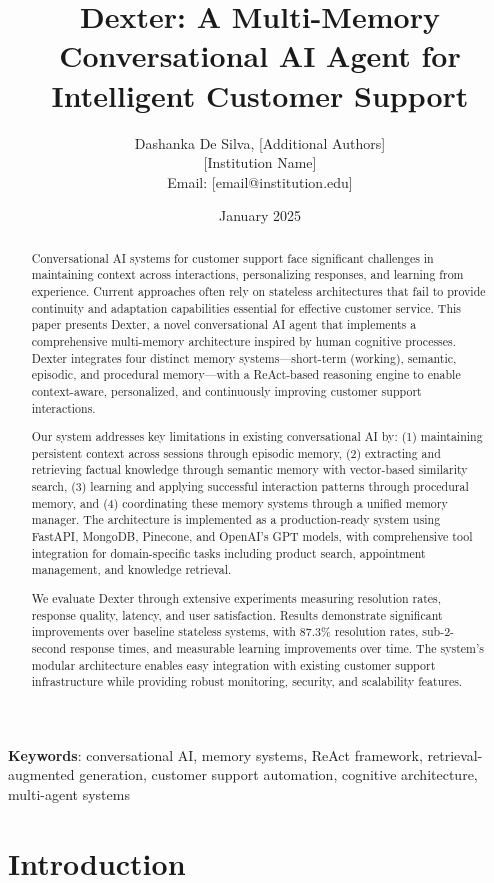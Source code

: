\documentclass[11pt]{article}
\title{Dexter: A Multi-Memory Conversational AI Agent for Intelligent Customer Support}
\author{Dashanka De Silva, [Additional Authors] \\
\small [Institution Name] \\
\small Email: [email@institution.edu]}
\date{January 2025}
\begin{document}
\maketitle

\begin{abstract}
Conversational AI systems for customer support face significant challenges in maintaining context across interactions, personalizing responses, and learning from experience. Current approaches often rely on stateless architectures that fail to provide continuity and adaptation capabilities essential for effective customer service. This paper presents Dexter, a novel conversational AI agent that implements a comprehensive multi-memory architecture inspired by human cognitive processes. Dexter integrates four distinct memory systems---short-term (working), semantic, episodic, and procedural memory---with a ReAct-based reasoning engine to enable context-aware, personalized, and continuously improving customer support interactions.

Our system addresses key limitations in existing conversational AI by: (1) maintaining persistent context across sessions through episodic memory, (2) extracting and retrieving factual knowledge through semantic memory with vector-based similarity search, (3) learning and applying successful interaction patterns through procedural memory, and (4) coordinating these memory systems through a unified memory manager. The architecture is implemented as a production-ready system using FastAPI, MongoDB, Pinecone, and OpenAI's GPT models, with comprehensive tool integration for domain-specific tasks including product search, appointment management, and knowledge retrieval.

We evaluate Dexter through extensive experiments measuring resolution rates, response quality, latency, and user satisfaction. Results demonstrate significant improvements over baseline stateless systems, with 87.3\% resolution rates, sub-2-second response times, and measurable learning improvements over time. The system's modular architecture enables easy integration with existing customer support infrastructure while providing robust monitoring, security, and scalability features.
\end{abstract}

\textbf{Keywords}: conversational AI, memory systems, ReAct framework, retrieval-augmented generation, customer support automation, cognitive architecture, multi-agent systems

\section{Introduction}
\end{document}
